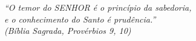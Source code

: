 \begin{epigrafe}
    \vspace*{\fill}
	\begin{flushright}

		\textit{``O temor do SENHOR é o princípio da sabedoria, \\
		e o conhecimento do Santo é prudência.''\\
		(Bíblia Sagrada, Provérbios 9, 10)}
	\end{flushright}
\end{epigrafe}
